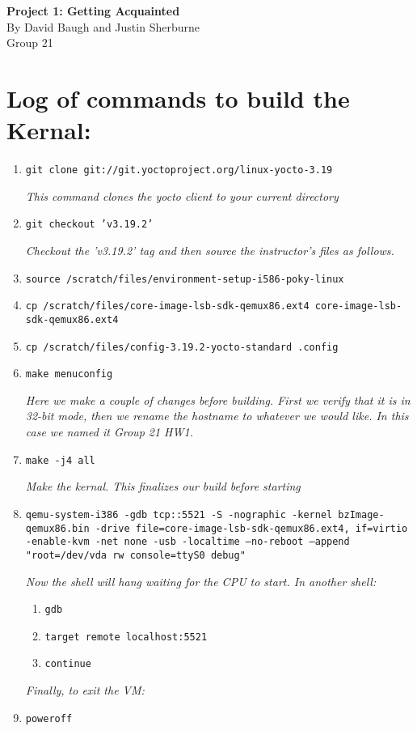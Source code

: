 \documentclass[letterpaper,10pt,titlepage]{article}
\begin{document}
\begin{center}
\textbf{\huge{Project 1: Getting Acquainted}}
\\By David Baugh and Justin Sherburne
\\Group 21
\end{center}
\section*{Log of commands to build the Kernal:}
\begin{enumerate}
\item \texttt{git clone git://git.yoctoproject.org/linux-yocto-3.19}

\textsl{This command clones the yocto client to your current directory}
\item \texttt{git checkout 'v3.19.2'}

\textsl{Checkout the 'v3.19.2' tag and then source the instructor's files as 
follows.}
\item \texttt{source /scratch/files/environment-setup-i586-poky-linux}
\item \texttt{cp /scratch/files/core-image-lsb-sdk-qemux86.ext4 
core-image-lsb-sdk-qemux86.ext4}
\item \texttt{cp /scratch/files/config-3.19.2-yocto-standard .config}
\item \texttt{make menuconfig}

\textsl{Here we make a couple of changes before building. First we verify that 
it is in 32-bit mode, then we rename the hostname to whatever we would like. 
In this case we named it Group 21 HW1.}
\item \texttt{make -j4 all}

\textsl{Make the kernal. This finalizes our build before starting}
\item \texttt{qemu-system-i386 -gdb tcp::5521 -S -nographic -kernel 
bzImage-qemux86.bin -drive file=core-image-lsb-sdk-qemux86.ext4,
if=virtio -enable-kvm -net none -usb -localtime --no-reboot 
--append "root=/dev/vda rw console=ttyS0 debug"}

\textsl{Now the shell will hang waiting for the CPU to start. In another shell:}
\begin{enumerate}
	\item \texttt{gdb}
	\item \texttt{target remote localhost:5521}
	\item \texttt{continue}
\end{enumerate}
\textsl{Finally, to exit the VM:} 
\item \texttt{poweroff}
\end{enumerate}
\end{document}
